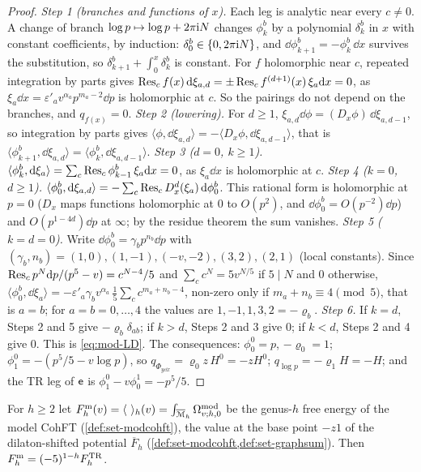 \begin{proof}
\emph{Step 1 (branches and functions of $x$).} Each leg is analytic near every $c\neq 0$. A change of branch $\log p\mapsto\log p+2\pi\mathrm{i} N$ changes $\phi^b_k$ by a polynomial $\delta^b_k$ in $x$ with constant coefficients, by induction: $\delta^b_0\in\{0,2\pi\mathrm{i} N\}$, and $\dd\phi^b_{k+1}=-\phi^b_k\,\dd x$ survives the substitution, so $\delta^b_{k+1}+\int_0^x\delta^b_k$ is constant. For $f$ holomorphic near $c$, repeated integration by parts gives $\operatorname*{Res}_cf(x)\,\mathrm{d}\xi_{a,d}=\pm\operatorname*{Res}_cf^{(d+1)}(x)\,\xi_a\mathrm{d} x=0$, as $\xi_a\dd x=\varepsilon'_av^{\alpha_a}p^{m_a-2}\dd p$ is holomorphic at $c$. So the pairings do not depend on the branches, and $q_{f(x)}=0$.
\emph{Step 2 (lowering).} For $d\geq 1$, $\xi_{a,d}\dd\phi=(D_x\phi)\,\dd\xi_{a,d-1}$, so integration by parts gives $\langle\phi,\dd\xi_{a,d}\rangle=-\langle D_x\phi,\dd\xi_{a,d-1}\rangle$, that is $\langle\phi^b_{k+1},\dd\xi_{a,d}\rangle=\langle\phi^b_k,\dd\xi_{a,d-1}\rangle$.
\emph{Step 3 ($d=0$, $k\geq 1$).} $\langle\phi^b_k,\mathrm{d}\xi_a\rangle=\sum_c\operatorname*{Res}_c\phi^b_{k-1}\,\xi_a\mathrm{d} x=0$, as $\xi_a\dd x$ is holomorphic at $c$.
\emph{Step 4 ($k=0$, $d\geq 1$).} $\langle\phi^b_0,\mathrm{d}\xi_{a,d}\rangle=-\sum_c\operatorname*{Res}_cD_x^d(\xi_a)\,\mathrm{d}\phi^b_0$. This rational form is holomorphic at $p=0$ ($D_x$ maps functions holomorphic at $0$ to $O(p^2)$, and $\dd\phi^b_0=O(p^{-2})\dd p$) and $O(p^{1-4d})\dd p$ at $\infty$; by the residue theorem the sum vanishes.
\emph{Step 5 ($k=d=0$).} Write $\dd\phi^b_0=\gamma_bp^{n_b}\dd p$ with $(\gamma_b,n_b)=(1,0),(1,-1),(-v,-2),(3,2),(2,1)$ (local constants). Since $\operatorname*{Res}_cp^N\mathrm{d} p/(p^5-v)=c^{N-4}/5$ and $\sum_cc^N=5v^{N/5}$ if $5\mid N$ and $0$ otherwise, $\langle\phi^b_0,\dd\xi_a\rangle=-\varepsilon'_a\gamma_bv^{\alpha_a}\,\frac15\sum_cc^{m_a+n_b-4}$, non-zero only if $m_a+n_b\equiv 4\pmod 5$, that is $a=b$; for $a=b=0,\dots,4$ the values are $1,-1,1,3,2=-\varrho_b$.
\emph{Step 6.} If $k=d$, Steps 2 and 5 give $-\varrho_b\delta_{ab}$; if $k>d$, Steps 2 and 3 give $0$; if $k<d$, Steps 2 and 4 give $0$. This is \eqref{eq:mod-LD}. The consequences: $\phi^0_0=p$, $-\varrho_0=1$; $\phi^0_1=-(p^5/5-v\log p)$, so $q_{\Phi_{y\dd x}}=\varrho_0z\,H^0=-zH^0$; $q_{\log p}=-\varrho_1H=-H$; and the TR leg of $\mathsf{e}$ is $\phi^0_1-v\phi^1_0=-p^5/5$.
\end{proof}

\begin{cor}
\label{cor:mod-trF}
For $h\geq 2$ let $\Fm_h(v)=\langle\ \rangle_h(v)=\int_{\overline{\mathcal M}_h}\Omega^{\mathrm{mod}}_{v;h,0}$ be the genus-$h$ free energy of the model CohFT (\cref{def:set-modcohft}), the value at the base point $-z1$ of the dilaton-shifted potential $\overline F_h$ (\cref{def:set-modcohft,def:set-graphsum}). Then $F^{\mathrm{m}}_h=(-5)^{1-h}F^{\mathrm{TR}}_h$.
\end{cor}

